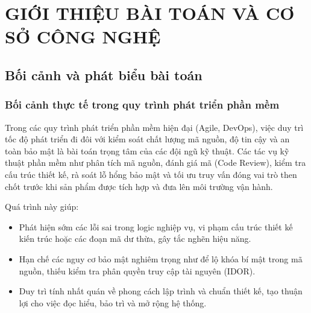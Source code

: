 \documentclass[12pt,a4paper]{report}
\begin{document}
\chapter{GIỚI THIỆU BÀI TOÁN VÀ CƠ SỞ CÔNG NGHỆ}

\section{Bối cảnh và phát biểu bài toán}
\subsection{Bối cảnh thực tế trong quy trình phát triển phần mềm}
Trong các quy trình phát triển phần mềm hiện đại (Agile, DevOps), việc duy trì tốc độ phát triển đi đôi với kiểm soát chất lượng mã nguồn, độ tin cậy và an toàn bảo mật là bài toán trọng tâm của các đội ngũ kỹ thuật. Các tác vụ kỹ thuật phần mềm như phân tích mã nguồn, đánh giá mã (Code Review), kiểm tra cấu trúc thiết kế, rà soát lỗ hổng bảo mật và tối ưu truy vấn đóng vai trò then chốt trước khi sản phẩm được tích hợp và đưa lên môi trường vận hành.

Quá trình này giúp:
\begin{itemize}
    \item Phát hiện sớm các lỗi sai trong logic nghiệp vụ, vi phạm cấu trúc thiết kế kiến trúc hoặc các đoạn mã dư thừa, gây tắc nghẽn hiệu năng.
    \item Hạn chế các nguy cơ bảo mật nghiêm trọng như để lộ khóa bí mật trong mã nguồn, thiếu kiểm tra phân quyền truy cập tài nguyên (IDOR).
    \item Duy trì tính nhất quán về phong cách lập trình và chuẩn thiết kế, tạo thuận lợi cho việc đọc hiểu, bảo trì và mở rộng hệ thống.
\end{itemize}
\end{document}

